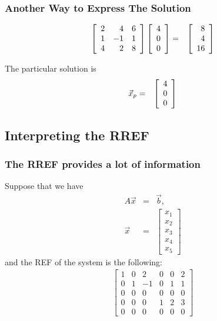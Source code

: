 \begin{frame}
  \frametitle{Another Way to Express The Solution}
  
  \begin{eqnarray*}
    \left[ \begin{array}{rrr} 2 & 4 & 6 \\ 1 & -1 & 1 \\ 4 & 2 & 8 \end{array} \right] \left[ \begin{array}{r} 4 \\ 0 \\ 0 \end{array} \right] 
    & = & \left[ \begin{array}{r} 8 \\ 4 \\ 16 \end{array} \right]
  \end{eqnarray*}

  The particular solution is 
  \begin{eqnarray*}
    \vec{x}_p & = & \left[ \begin{array}{r} 4 \\ 0 \\ 0 \end{array} \right] 
  \end{eqnarray*}


\end{frame}

\subsection{Interpreting the RREF}

\begin{frame}
  \frametitle{The RREF provides a lot of information}

  Suppose that we have 
  \begin{eqnarray*}
    A\vec{x} & = & \vec{b}, \\
    \vec{x} & = & 
    \left[ \begin{array}{r}x_1\\x_2\\x_3\\x_4\\x_5\end{array}\right]
  \end{eqnarray*}
  and the REF of the system is the following:
  \begin{eqnarray*}
    \left[
      \begin{array}{rrrrr|r}
        1 & 0 & 2 & 0 & 0 & 2 \\
        0 & 1 & -1 & 0 & 1 & 1 \\
        0 & 0 & 0 & 0 & 0 & 0 \\
        0 & 0 & 0 & 1 & 2 & 3 \\
        0 & 0 & 0 & 0 & 0 & 0 
      \end{array}
    \right]
  \end{eqnarray*}

\end{frame}


